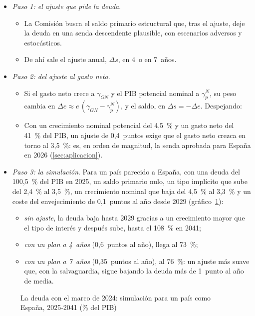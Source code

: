 \documentclass[11pt]{article}
\begin{document}
\begin{itemize}
\item \emph{Paso 1: el ajuste que pide la deuda}.
  \begin{itemize}
  \item La Comisión busca el saldo primario estructural que, tras el ajuste, deje la deuda en una senda descendente plausible, con escenarios adversos y estocásticos.
  \item De ahí sale el ajuste anual, $\Delta s$, en 4~o en 7~años.
  \end{itemize}
\item \emph{Paso 2: del ajuste al gasto neto}.
  \begin{itemize}
  \item Si el gasto neto crece a $\gamma_{GN}$ y el PIB potencial nominal a $\gamma^N_p$, su peso cambia en $\Delta e\approx e\,(\gamma_{GN}-\gamma^N_p)$, y el saldo, en $\Delta s=-\Delta e$. Despejando:
  \item Con un crecimiento nominal potencial del 4,5~\% y un gasto neto del 41~\% del PIB, un ajuste de 0,4~puntos exige que el gasto neto crezca en torno al 3,5~\%: es, en orden de magnitud, la senda aprobada para España en 2026 (\ref{sec:aplicacion}).
  \end{itemize}
\item \emph{Paso 3: la simulación}. Para un país parecido a España, con una deuda del 100,5~\% del PIB en 2025, un saldo primario nulo, un tipo implícito que sube del 2,4~\% al 3,5~\%, un crecimiento nominal que baja del 4,5~\% al 3,3~\% y un coste del envejecimiento de 0,1~puntos al año desde 2029 (gráfico~\ref{fig:simulacion}):
  \begin{itemize}
  \item \emph{sin ajuste}, la deuda baja hasta 2029 gracias a un crecimiento mayor que el tipo de interés y después sube, hasta el 108~\% en 2041;
  \item \emph{con un plan a 4~años} (0,6~puntos al año), llega al 73~\%;
  \item \emph{con un plan a 7~años} (0,35~puntos al año), al 76~\%: un ajuste más suave que, con la salvaguardia, sigue bajando la deuda más de 1~punto al año de media.
  \end{itemize}
\end{itemize}

\begin{figure}[H]
\centering
\caption{La deuda con el marco de 2024: simulación para un país como España, 2025-2041 (\% del PIB)}\label{fig:simulacion}
\end{figure}
\end{document}
